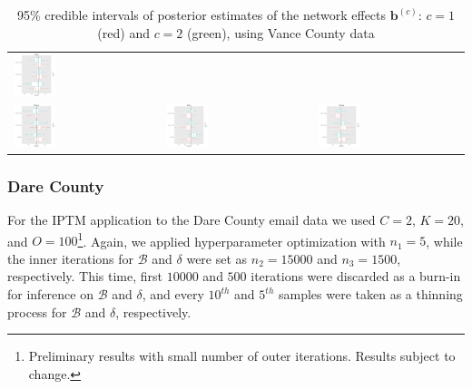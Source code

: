 \documentclass[a4paper]{article}
\begin{document}
\begin{table}[ht]
\begin{tabular}{lll}
          		\includegraphics[width = 0.3\textwidth]{plots/Vance2Send-1.png}   \\ 
          		\includegraphics[width = 0.3\textwidth]{plots/Vance2Receive-1.png} &
          		\includegraphics[width = 0.3\textwidth]{plots/VanceSibling-1.png} &
          		\includegraphics[width = 0.3\textwidth]{plots/VanceCosibling-1.png}   \\         	
          	\end{tabular}
          	\label{fig:VanceB}
          	\caption{95\% credible intervals of posterior estimates of the network effects $\boldsymbol{b}^{(c)}$: $c=1$ (red) and $c=2$ (green), using Vance County data}
          \end{table}
                        	\newpage
          	\subsubsection{Dare County}\label{subsubsec:DareIPTM}
          	For the IPTM application to the Dare County email data we used $C=2$, $K=20$, and $O= 100$\footnote{Preliminary results with small number of outer iterations. Results subject to change.}. Again, we applied hyperparameter optimization with $n_1=5$, while the inner iterations for $\mathcal{B}$ and $\delta$ were set as $n_2=15000$ and $n_3 = 1500$, respectively. This time, first $10000$ and $500$ iterations were discarded as a burn-in for inference on  $\mathcal{B}$ and $\delta$, and every $10^{th}$ and $5^{th}$ samples were taken as a thinning process for $\mathcal{B}$ and $\delta$, respectively. 
          	
\end{document}
